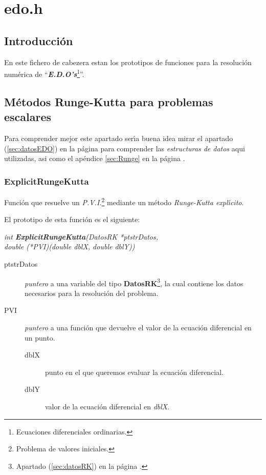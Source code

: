 %
%

\chapter{edo.h}

\section{Introducci\'on}
En este fichero de cabezera estan los prototipos de funciones para la
resoluci\'on num\'erica de ``\emph{\textbf{E.D.O's}}\footnote{Ecuaciones
diferenciales ordinarias.}''.

\section{M\'etodos Runge-Kutta para problemas escalares}
Para comprender mejor este apartado ser\'{\i}a buena idea mirar el 
apartado (\ref{sec:datosEDO}) en la p\'agina \pageref{sec:datosEDO} 
para comprender las \emph{estructuras de datos} aqui utilizadas, asi
como el ap\'endice \ref{sec:Runge} en la p\'agina \pageref{sec:Runge}.

\newpage

\subsection{ExplicitRungeKutta}

Funci\'on que resuelve un \emph{P.V.I.}\footnote{Problema de valores 
iniciales.} mediante un m\'etodo \emph{Runge-Kutta expl\'{\i}cito}.\newline

El prototipo de esta funci\'on es el siguiente:

\begin{center}
\emph{int \textbf{ExplicitRungeKutta}(DatosRK *ptstrDatos,\\
double (*PVI)(double dblX, double dblY))}
\end{center} 

\begin{description}
\item[ptstrDatos] \emph{puntero} a una variable del tipo 
\textbf{DatosRK}\footnote{Apartado (\ref{sec:datosRK}) en la p\'agina 
\pageref{sec:datosRK}.}, la cual contiene los datos necesarios para
la resoluci\'on del problema.
\item[PVI] \emph{puntero} a una funci\'on que devuelve el valor de la
ecuaci\'on diferencial en un punto.
\begin{description}
	\item[dblX] punto en el que queremos evaluar la ecuaci\'on diferencial.
	\item[dblY] valor de la ecuaci\'on diferencial en \emph{dblX}.
\end{description}
\end{description}

